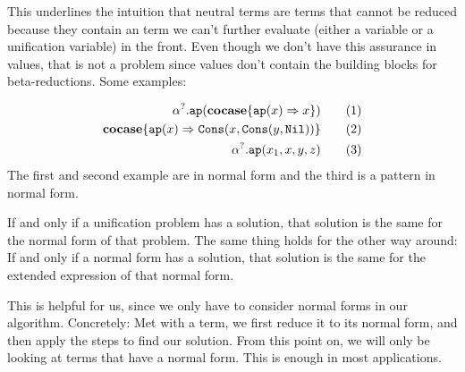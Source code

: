 \documentclass[twoside,12pt,a4paper]{article}
\begin{document}
This underlines the intuition that neutral terms are terms that cannot be reduced because
they contain an term we can't further evaluate (either a variable or a unification variable) in the front.
Even though we don't have this assurance in values, that is not a problem since values don't contain the building blocks for beta-reductions. 
Some examples: 
\begin{example}
\begin{align*}
    \alpha^?.\texttt{ap}(\textbf{cocase}\{\texttt{ap}(x)\Rightarrow x\}) \tag{1}\\
    \textbf{cocase}\{\texttt{ap}(x)\Rightarrow \mathtt{Cons(\mathnormal{x}, Cons(\mathnormal{y}, Nil))}\} \tag{2}\\
    \alpha^?.\texttt{ap}(x_1, x, y, z) \tag{3}    
\end{align*}
The first and second example are in normal form and the third is a pattern in normal form.
\end{example}

\begin{theorem}
    If and only if a unification problem has a solution, that solution is the same for the normal form of that problem. 
    The same thing holds for the other way around: If and only if a normal form has a solution, that solution is the same for the extended expression of that normal form. 
\end{theorem}

This is helpful for us, since we only have to consider normal forms in our algorithm.
Concretely: Met with a term, we first reduce it to its normal form, and then apply the steps to find our solution.
From this point on, we will only be looking at terms that have a normal form. This is enough in most applications. %
\end{document}
